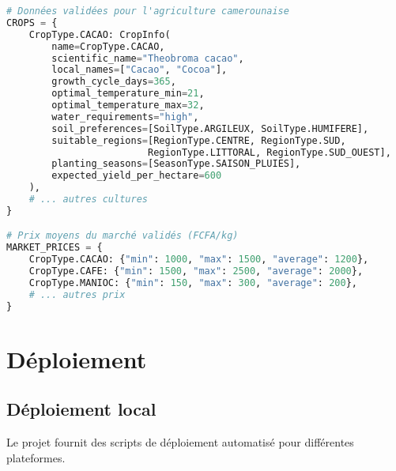 \begin{lstlisting}[language=Python, caption=Validation des données agricoles (agriculture\_cameroun/utils/data.py)]
# Données validées pour l'agriculture camerounaise
CROPS = {
    CropType.CACAO: CropInfo(
        name=CropType.CACAO,
        scientific_name="Theobroma cacao",
        local_names=["Cacao", "Cocoa"],
        growth_cycle_days=365,
        optimal_temperature_min=21,
        optimal_temperature_max=32,
        water_requirements="high",
        soil_preferences=[SoilType.ARGILEUX, SoilType.HUMIFERE],
        suitable_regions=[RegionType.CENTRE, RegionType.SUD, 
                         RegionType.LITTORAL, RegionType.SUD_OUEST],
        planting_seasons=[SeasonType.SAISON_PLUIES],
        expected_yield_per_hectare=600
    ),
    # ... autres cultures
}

# Prix moyens du marché validés (FCFA/kg)
MARKET_PRICES = {
    CropType.CACAO: {"min": 1000, "max": 1500, "average": 1200},
    CropType.CAFE: {"min": 1500, "max": 2500, "average": 2000},
    CropType.MANIOC: {"min": 150, "max": 300, "average": 200},
    # ... autres prix
}
\end{lstlisting}

\section{Déploiement}

\subsection{Déploiement local}

Le projet fournit des scripts de déploiement automatisé pour différentes plateformes.

